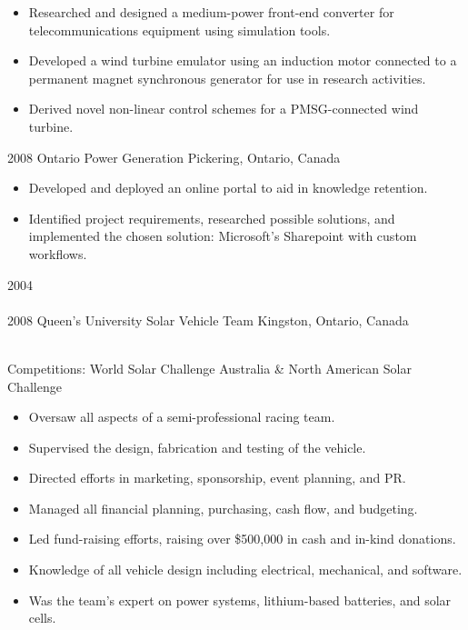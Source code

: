 \begin{entrylist}
{  \begin{itemize}[leftmargin=12pt]
    \item Researched and designed a medium-power front-end converter for telecommunications equipment using simulation tools.
    \item Developed a wind turbine emulator using an induction motor connected to a permanent magnet synchronous generator for use in research activities.
    \item Derived novel non-linear control schemes for a PMSG-connected wind turbine.
  \end{itemize}}
\entry
  {2008}
  {Ontario Power Generation}
  {Pickering, Ontario, Canada}
  {
  \begin{itemize}[leftmargin=12pt]
    \item Developed and deployed an online portal to aid in knowledge retention.
    \item Identified project requirements, researched possible solutions, and implemented the chosen solution: Microsoft's Sharepoint with custom workflows.
  \end{itemize}
}
\entry
  {2004\\\faChevronDown\\2008}
  {Queen's University Solar Vehicle Team}
  {Kingston, Ontario, Canada}
  {\\
  Competitions: {\bodyfontit World Solar Challenge Australia} \&
  {\bodyfontit North American Solar Challenge}
  \begin{itemize}[leftmargin=12pt]
    \item Oversaw all aspects of a semi-professional racing team.
    \item Supervised the design, fabrication and testing of the vehicle.
    \item Directed efforts in marketing, sponsorship, event planning, and PR.
    \item Managed all financial planning, purchasing, cash flow, and budgeting.
    \item Led fund-raising efforts, raising over \$500,000 in cash and in-kind donations.
    \item Knowledge of all vehicle design including electrical, mechanical, and software.
    \item Was the team’s expert on power systems, lithium-based batteries, and solar cells.

\end{itemize}}
\end{entrylist}
